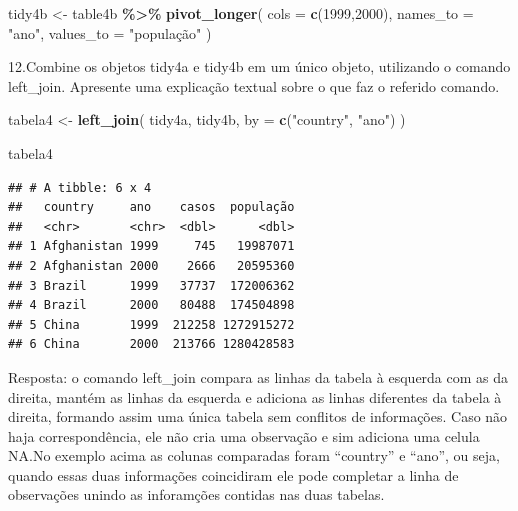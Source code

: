\documentclass[
]{article}
\newenvironment{Shaded}{\begin{snugshade}}{\end{snugshade}}
\newcommand{\AttributeTok}[1]{\textcolor[rgb]{0.13,0.29,0.53}{#1}}
\newcommand{\FunctionTok}[1]{\textcolor[rgb]{0.13,0.29,0.53}{\textbf{#1}}}
\newcommand{\NormalTok}[1]{#1}
\newcommand{\OtherTok}[1]{\textcolor[rgb]{0.56,0.35,0.01}{#1}}
\newcommand{\SpecialCharTok}[1]{\textcolor[rgb]{0.81,0.36,0.00}{\textbf{#1}}}
\newcommand{\StringTok}[1]{\textcolor[rgb]{0.31,0.60,0.02}{#1}}
\begin{document}
\begin{Shaded}
\begin{Highlighting}[]
\NormalTok{tidy4b }\OtherTok{\textless{}{-}}\NormalTok{ table4b }\SpecialCharTok{\%\textgreater{}\%} 
                  \FunctionTok{pivot\_longer}\NormalTok{(}
                    \AttributeTok{cols =} \FunctionTok{c}\NormalTok{(}\StringTok{\textquotesingle{}1999\textquotesingle{}}\NormalTok{,}\StringTok{\textquotesingle{}2000\textquotesingle{}}\NormalTok{),}
                    \AttributeTok{names\_to =} \StringTok{"ano"}\NormalTok{,}
                    \AttributeTok{values\_to =} \StringTok{"população"}
\NormalTok{                  )}
\end{Highlighting}
\end{Shaded}

12.Combine os objetos tidy4a e tidy4b em um único objeto, utilizando o
comando left\_join. Apresente uma explicação textual sobre o que faz o
referido comando.

\begin{Shaded}
\begin{Highlighting}[]
\NormalTok{tabela4 }\OtherTok{\textless{}{-}} \FunctionTok{left\_join}\NormalTok{(}
\NormalTok{            tidy4a,}
\NormalTok{            tidy4b,}
            \AttributeTok{by =} \FunctionTok{c}\NormalTok{(}\StringTok{"country"}\NormalTok{, }\StringTok{"ano"}\NormalTok{)}
\NormalTok{)}

\NormalTok{tabela4}
\end{Highlighting}
\end{Shaded}

\begin{verbatim}
## # A tibble: 6 x 4
##   country     ano    casos  população
##   <chr>       <chr>  <dbl>      <dbl>
## 1 Afghanistan 1999     745   19987071
## 2 Afghanistan 2000    2666   20595360
## 3 Brazil      1999   37737  172006362
## 4 Brazil      2000   80488  174504898
## 5 China       1999  212258 1272915272
## 6 China       2000  213766 1280428583
\end{verbatim}

Resposta: o comando left\_join compara as linhas da tabela à esquerda
com as da direita, mantém as linhas da esquerda e adiciona as linhas
diferentes da tabela à direita, formando assim uma única tabela sem
conflitos de informações. Caso não haja correspondência, ele não cria
uma observação e sim adiciona uma celula NA.No exemplo acima as colunas
comparadas foram ``country'' e ``ano'', ou seja, quando essas duas
informações coincidiram ele pode completar a linha de observações unindo
as inforamções contidas nas duas tabelas.
\end{document}
